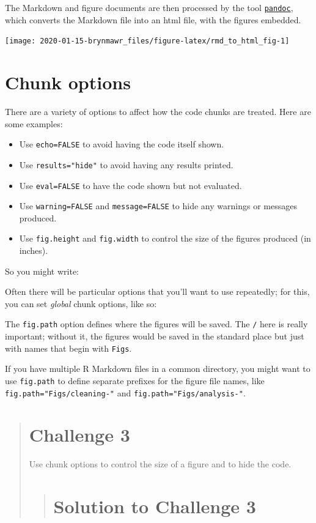 \documentclass[]{book}
\providecommand{\tightlist}{%
  \setlength{\itemsep}{0pt}\setlength{\parskip}{0pt}}
\begin{document}
The Markdown and figure documents are then processed by the tool
\href{http://pandoc.org/}{\texttt{pandoc}}, which converts the Markdown
file into an html file, with the figures embedded.

\begin{flushleft}\texttt{[image: 2020-01-15-brynmawr\_files/figure-latex/rmd\_to\_html\_fig-1]} \end{flushleft}

\section{Chunk options}\label{chunk-options}

There are a variety of options to affect how the code chunks are
treated. Here are some examples:

\begin{itemize}
\tightlist
\item
  Use \texttt{echo=FALSE} to avoid having the code itself shown.
\item
  Use \texttt{results="hide"} to avoid having any results printed.
\item
  Use \texttt{eval=FALSE} to have the code shown but not evaluated.
\item
  Use \texttt{warning=FALSE} and \texttt{message=FALSE} to hide any
  warnings or messages produced.
\item
  Use \texttt{fig.height} and \texttt{fig.width} to control the size of
  the figures produced (in inches).
\end{itemize}

So you might write:

Often there will be particular options that you'll want to use
repeatedly; for this, you can set \emph{global} chunk options, like so:

The \texttt{fig.path} option defines where the figures will be saved.
The \texttt{/} here is really important; without it, the figures would
be saved in the standard place but just with names that begin with
\texttt{Figs}.

If you have multiple R Markdown files in a common directory, you might
want to use \texttt{fig.path} to define separate prefixes for the figure
file names, like \texttt{fig.path="Figs/cleaning-"} and
\texttt{fig.path="Figs/analysis-"}.

\begin{quote}
\section{Challenge 3}\label{challenge-3-1}

Use chunk options to control the size of a figure and to hide the code.

\begin{quote}
\section{Solution to Challenge 3}\label{solution-to-challenge-3}
\end{quote}
\end{quote}
\end{document}
